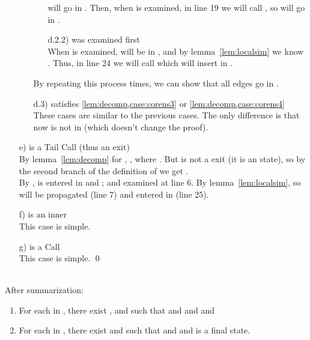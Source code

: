 \documentclass{LMCS}
\theoremstyle{definition} \newtheorem{property}[thm]{Property}
\begin{document}
\begin{enumerate}[]
\begin{enumerate}[]
\begin{enumerate}[]
      will go in \tcallers.
      Then, when  is examined, 
      in line 19 we will call \slp 
      \srp, so
       will go in \seen.
    \item[d.2.2)]
       was examined first \\
      When  is
      examined,  will be in \summary,
      and by lemma~\ref{lem:localsim} we know 
      .
      Thus, in line 24 we will call  which will insert
       in \seen.
    \end{enumerate}
    By repeating this process  times, we can show that all edges
     go in \seen.
  \item[d.3)]
     satisfies \ref{lem:decomp,case:corens3}
    or \ref{lem:decomp,case:corens4} \\
    These cases are similar to the previous cases.
    The only difference is that now \ainitstate{} is not in
     (which doesn't change the proof).
  \end{enumerate}
\item[e)]
  \astat{} is a Tail Call (thus an exit) \\
  By lemma~\ref{lem:decomp} for , 
  ,
  where . 
  But  is not a \daceval{} exit (it is an \daapply{} state), so by the second
  branch of the definition of \dcoren{} we get . \\
  By \ih{},  is entered in \seen{} and
  \work{}; and examined at line 6.
  By lemma~\ref{lem:localsim},  
  so  will be propagated (line 7)
  and entered in \seen{} (line 25).
\item[f)]
  \astat{} is an inner \daceval \\
  This case is simple.
\item[g)]
  \astat{} is a Call \\
  This case is simple.
  \qed
\end{enumerate}
\newline
\begin{thm}[Completeness] ~\\
  After summarization:
  \begin{enumerate}[]
  \item
    For each  in \seen,
    there exist \astato, \astatw{} and  such that 
     and
     and
     and
    
  \item
    For each \lstat{} in \finals, 
    there exist \astat{} and  such that 
     and  and
    \astat{} is a final state.
  \end{enumerate}
\end{thm}
\end{document}
